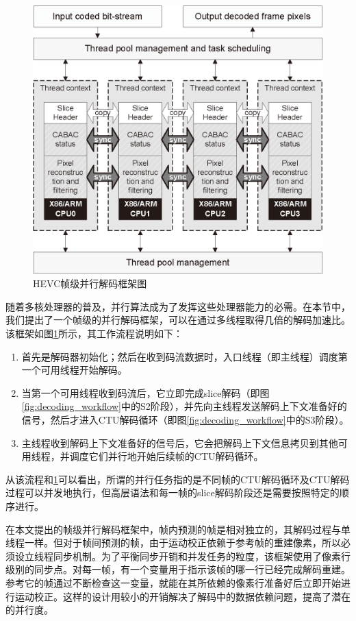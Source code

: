 \begin{figure}[!tp]
	\centering
	\includegraphics[width = 0.8\linewidth]{eps/parallel_decoding_framework}
	\caption{\label{fig:parallel_decoding_framework}HEVC帧级并行解码框架图}
\end{figure}

随着多核处理器的普及，并行算法成为了发挥这些处理器能力的必需。在本节中，我们提出了一个帧级的并行解码框架，可以在通过多线程取得几倍的解码加速比。该框架如图\ref{fig:parallel_decoding_framework}所示，其工作流程说明如下：
\begin{enumerate}
	\item 首先是解码器初始化；然后在收到码流数据时，入口线程（即主线程）调度第一个可用线程开始解码。
	\item 当第一个可用线程收到码流后，它立即完成slice解码（即图\ref{fig:decoding_workflow}中的S2阶段），并先向主线程发送解码上下文准备好的信号，然后才进入CTU解码循环（即图\ref{fig:decoding_workflow}中的S3阶段）。
	\item 主线程收到解码上下文准备好的信号后，它会把解码上下文信息拷贝到其他可用线程，并调度它们并行地开始后续帧的CTU解码循环。
\end{enumerate}

从该流程和\ref{fig:parallel_decoding_framework}可以看出，所谓的并行任务指的是不同帧的CTU解码循环及CTU解码过程可以并发地执行，但高层语法和每一帧的slice解码阶段还是需要按照特定的顺序进行。

在本文提出的帧级并行解码框架中，帧内预测的帧是相对独立的，其解码过程与单线程一样。但对于帧间预测的帧，由于运动校正依赖于参考帧的重建像素，所以必须设立线程同步机制。为了平衡同步开销和并发任务的粒度，该框架使用了像素行级别的同步点。对每一帧，有一个变量用于指示该帧的哪一行已经完成解码重建。参考它的帧通过不断检查这一变量，就能在其所依赖的像素行准备好后立即开始进行运动校正。这样的设计用较小的开销解决了解码中的数据依赖问题，提高了潜在的并行度。


